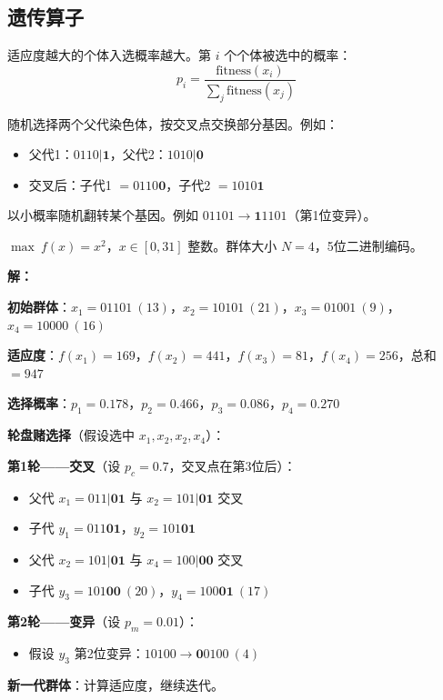 \subsection{遗传算子}

\begin{conceptbox}
适应度越大的个体入选概率越大。第 $i$ 个个体被选中的概率：
\[
p_i = \frac{\text{fitness}(x_i)}{\sum_j \text{fitness}(x_j)}
\]
\end{conceptbox}

\begin{conceptbox}[交叉（Crossover）]
随机选择两个父代染色体，按交叉点交换部分基因。例如：
\begin{itemize}
    \item 父代1：$0110|\textbf{1}$，父代2：$1010|\textbf{0}$
    \item 交叉后：子代1 $= 0110\textbf{0}$，子代2 $= 1010\textbf{1}$
\end{itemize}
\end{conceptbox}

\begin{conceptbox}[变异（Mutation）]
以小概率随机翻转某个基因。例如 $01101 \to \textbf{1}1101$（第1位变异）。
\end{conceptbox}

\begin{example}\label{ex:ga}
$\max\ f(x) = x^2$，$x \in [0, 31]$ 整数。群体大小 $N=4$，5位二进制编码。

\textbf{解：}

\textbf{初始群体}：$x_1 = 01101\ (13)$，$x_2 = 10101\ (21)$，$x_3 = 01001\ (9)$，$x_4 = 10000\ (16)$

\textbf{适应度}：$f(x_1)=169$，$f(x_2)=441$，$f(x_3)=81$，$f(x_4)=256$，总和 $= 947$

\textbf{选择概率}：$p_1=0.178$，$p_2=0.466$，$p_3=0.086$，$p_4=0.270$

\textbf{轮盘赌选择}（假设选中 $x_1, x_2, x_2, x_4$）：

\textbf{第1轮——交叉}（设 $p_c = 0.7$，交叉点在第3位后）：
\begin{itemize}
    \item 父代 $x_1=011|\textbf{01}$ 与 $x_2=101|\textbf{01}$ 交叉
    \item 子代 $y_1 = 011\textbf{01}$，$y_2 = 101\textbf{01}$
    \item 父代 $x_2=101|\textbf{01}$ 与 $x_4=100|\textbf{00}$ 交叉
    \item 子代 $y_3 = 101\textbf{00}\ (20)$，$y_4 = 100\textbf{01}\ (17)$
\end{itemize}

\textbf{第2轮——变异}（设 $p_m = 0.01$）：
\begin{itemize}
    \item 假设 $y_3$ 第2位变异：$10100 \to \textbf{0}0100\ (4)$
\end{itemize}

\textbf{新一代群体}：计算适应度，继续迭代。
\end{example}

